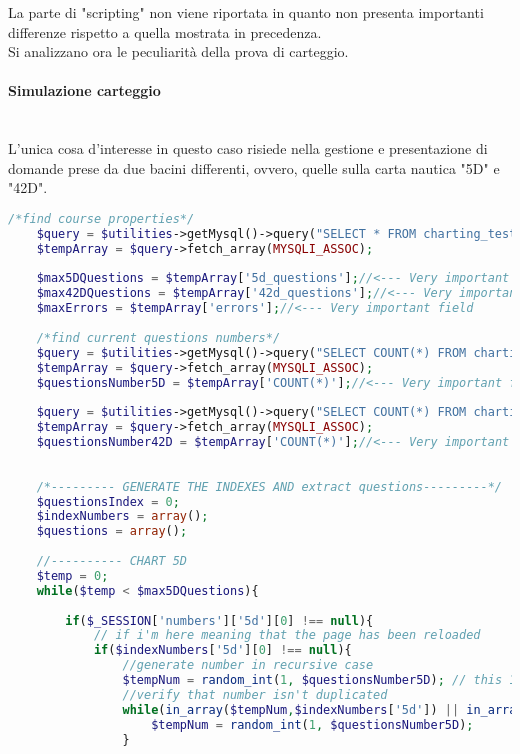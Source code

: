 La parte di "scripting" non viene riportata in quanto non presenta importanti differenze rispetto a quella mostrata in precedenza.\\

Si analizzano ora le peculiarità della prova di carteggio.\\

\paragraph{Simulazione carteggio}\leavevmode\\

L'unica cosa d'interesse in questo caso risiede nella gestione e presentazione di domande prese da due bacini differenti, ovvero, quelle sulla carta nautica "5D" e "42D". 

\begin{lstlisting}[language=php]
	/*find course properties*/
	$query = $utilities->getMysql()->query("SELECT * FROM charting_test_properties WHERE (id = '1')");
	$tempArray = $query->fetch_array(MYSQLI_ASSOC);
	
	$max5DQuestions = $tempArray['5d_questions'];//<--- Very important field
	$max42DQuestions = $tempArray['42d_questions'];//<--- Very important field
	$maxErrors = $tempArray['errors'];//<--- Very important field
	
	/*find current questions numbers*/
	$query = $utilities->getMysql()->query("SELECT COUNT(*) FROM charting_test_5d");
	$tempArray = $query->fetch_array(MYSQLI_ASSOC);
	$questionsNumber5D = $tempArray['COUNT(*)'];//<--- Very important field
	
	$query = $utilities->getMysql()->query("SELECT COUNT(*) FROM charting_test_42d");
	$tempArray = $query->fetch_array(MYSQLI_ASSOC);
	$questionsNumber42D = $tempArray['COUNT(*)'];//<--- Very important field
	
	
	/*--------- GENERATE THE INDEXES AND extract questions---------*/
	$questionsIndex = 0;
	$indexNumbers = array();
	$questions = array();
	
	//---------- CHART 5D
	$temp = 0;
	while($temp < $max5DQuestions){
		
		if($_SESSION['numbers']['5d'][0] !== null){
			// if i'm here meaning that the page has been reloaded      
			if($indexNumbers['5d'][0] !== null){
				//generate number in recursive case
				$tempNum = random_int(1, $questionsNumber5D); // this 1 is because i know that the questions starts form 1 into db
				//verify that number isn't duplicated
				while(in_array($tempNum,$indexNumbers['5d']) || in_array($tempNum,$_SESSION['numbers']['5d'])){
					$tempNum = random_int(1, $questionsNumber5D);
				}
				

\end{lstlisting}
